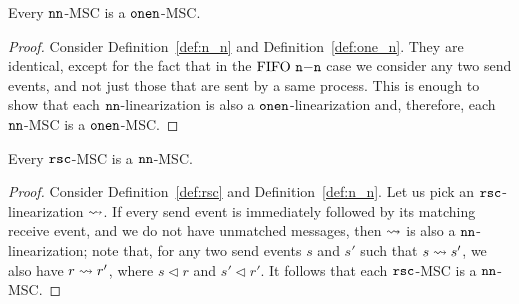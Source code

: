 	\begin{proposition} \label{prop:nn_is_onen}
		Every $\mathtt{nn}$-MSC is a $\mathtt{onen}$-MSC.
	\end{proposition}
	\begin{proof}
		Consider Definition~\ref{def:n_n} and Definition~\ref{def:one_n}. They are identical, except for the fact that in the $\text{FIFO } \mathtt{n\mathsf{-}n}$ case we consider any two send events, and not just those that are sent by a same process. This is enough to show that each $\mathtt{nn}$-linearization is also a $\mathtt{onen}$-linearization and, therefore, each $\mathtt{nn}$-MSC is a $\mathtt{onen}$-MSC.
	\end{proof}
	
	\begin{proposition} \label{prop:rsc_is_nn}
		Every $\mathtt{rsc}$-MSC is a $\mathtt{nn}$-MSC.
	\end{proposition}
	\begin{proof}
		Consider Definition~\ref{def:rsc} and Definition~\ref{def:n_n}. Let us pick an $\mathtt{rsc}$-linearization $\rightsquigarrow$. If every send event is immediately followed by its matching receive event, and we do not have unmatched messages, then $\rightsquigarrow$ is also a $\mathtt{nn}$-linearization; note that, for any two send events $s$ and $s'$ such that $s \rightsquigarrow s'$, we also have $r \rightsquigarrow r'$, where $s \lhd r$ and $s' \lhd r'$. It follows that each $\mathtt{rsc}$-MSC is a $\mathtt{nn}$-MSC.
	\end{proof}
	